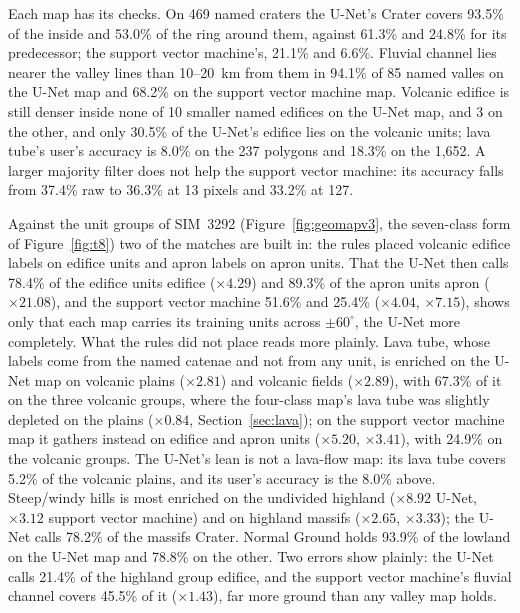 \documentclass[twocolumn]{aastex701}
\newcommand{\pmsixty}{$\pm60^{\circ}$}
\begin{document}
Each map has its checks. On 469 named craters the U-Net's Crater covers 93.5\% of the inside and 53.0\% of the ring
around them, against 61.3\% and 24.8\% for its predecessor; the support vector machine's, 21.1\% and 6.6\%. Fluvial
channel lies nearer the valley lines than 10--20~km from them in 94.1\% of 85 named valles on the U-Net map and 68.2\% on
the support vector machine map. Volcanic edifice is still denser inside none of 10 smaller named edifices on the
U-Net map, and 3 on the other, and only 30.5\% of the U-Net's edifice lies on the volcanic units; lava tube's user's
accuracy is 8.0\% on the 237 polygons and 18.3\% on the 1,652. A larger majority filter does not help the support vector
machine: its accuracy falls from 37.4\% raw to 36.3\% at 13 pixels and 33.2\% at 127. %

Against the unit groups of SIM~3292 (Figure~\ref{fig:geomapv3}, the seven-class form of Figure~\ref{fig:t8}) two of
the matches are built in: the rules placed volcanic edifice labels on edifice units and apron labels on apron units.
That the U-Net then calls 78.4\% of the edifice units edifice ($\times4.29$) and 89.3\% of the apron units apron
($\times21.08$), and the support vector machine 51.6\% and 25.4\% ($\times4.04$, $\times7.15$), shows only that each
map carries its training units across \pmsixty, the U-Net more completely. What the rules did not place reads more
plainly. Lava tube, whose labels come from the named catenae and not from any unit, is enriched on the U-Net map on
volcanic plains ($\times2.81$) and volcanic fields ($\times2.89$), with 67.3\% of it on the three volcanic groups,
where the four-class map's lava tube was slightly depleted on the plains ($\times0.84$, Section~\ref{sec:lava}); on
the support vector machine map it gathers instead on edifice and apron units ($\times5.20$, $\times3.41$), with
24.9\% on the volcanic groups. The U-Net's lean is not a lava-flow map: its lava tube covers 5.2\% of the volcanic
plains, and its user's accuracy is the 8.0\% above. Steep/windy hills is most enriched on the undivided highland
($\times8.92$ U-Net, $\times3.12$ support vector machine) and on highland massifs ($\times2.65$, $\times3.33$); the
U-Net calls 78.2\% of the massifs Crater. Normal Ground holds 93.9\% of the lowland on the U-Net map and 78.8\% on the
other. Two errors show plainly: the U-Net calls 21.4\% of the highland group edifice, and the support vector
machine's fluvial channel covers 45.5\% of it ($\times1.43$), far more ground than any valley map holds. %
\end{document}
